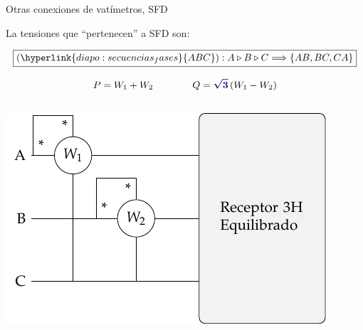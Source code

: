 \documentclass[aspectratio=169, usenames,svgnames,dvipsnames]{beamer}
\begin{document}
\begin{frame}{Otras conexiones de vatímetros, \hspace{3mm}SFD}

    \vspace{2mm}
    La tensiones que ``pertenecen'' a \alert{SFD} son:

    \vspace{-4mm}
    \[
      \boxed{(\hyperlink{diapo:secuencias_fases}{ABC}): A \triangleright B \triangleright C \Longrightarrow \{AB, BC, CA\}}
    \]

    \vspace{-2mm}
    \[
      P = W_1 + W_2\qquad \qquad Q = {\boldsymbol{\color{blue!50!black} \sqrt{3}}} \, (W_1 - W_2)
    \]
    
    \begin{columns}
    \begin{column}{0.33\columnwidth}
        \begin{center}
            \includegraphics[width=1\linewidth]{../figs/Potencia_3H_equilibrado_AB.pdf}
        \end{center}


\end{column}
\end{columns}
\end{frame}
\end{document}
